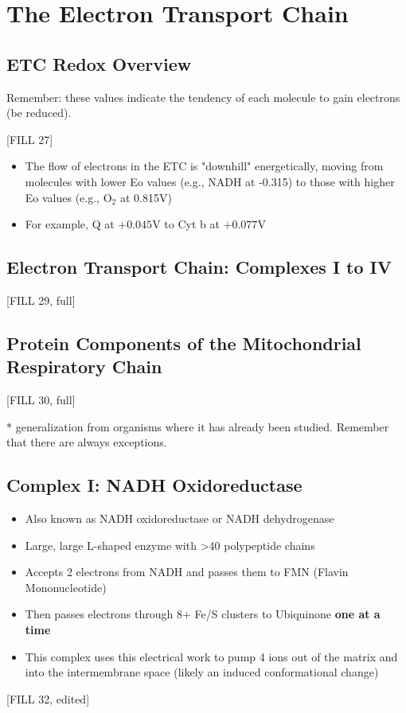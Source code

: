 \documentclass[10pt]{article}
\newcommand{\proton}{\text{H$^+$}}
\begin{document}
\section*{The Electron Transport Chain}
\subsection*{ETC Redox Overview}
Remember: these values indicate the tendency of each molecule to gain electrons (be reduced).
\begin{center} 
	[FILL 27]
\end{center}
\begin{itemize}
	\item The flow of electrons in the ETC is "downhill" energetically, moving from molecules with lower Eo values (e.g., NADH at -0.315) to those with higher Eo values (e.g., O$_2$ at 0.815V)
	\item For example, Q at $+0.045$V to Cyt b at $+0.077$V
\end{itemize}

\subsection*{Electron Transport Chain: Complexes I to IV}
\begin{center} 
	[FILL 29, full]
\end{center}

\subsection*{Protein Components of the Mitochondrial Respiratory Chain}
\begin{center} 
	[FILL 30, full]
\end{center}
* generalization from organisms where it has already been studied.  Remember that there are always exceptions.

\subsection*{Complex I: NADH Oxidoreductase}
\begin{itemize}
	\item Also known as NADH oxidoreductase or NADH dehydrogenase
	\item Large, large L-shaped enzyme with >40 polypeptide chains
	\item Accepts 2 electrons from NADH and passes them to FMN (Flavin Mononucleotide)
	\item Then passes electrons through 8+ Fe/S clusters to Ubiquinone \textbf{one at a time}
	\item This complex uses this electrical work to pump 4 \proton ions out of the matrix and into the intermembrane space (likely an induced conformational change)
\end{itemize}
\begin{center} 
	[FILL 32, edited]
\end{center}
\end{document}
